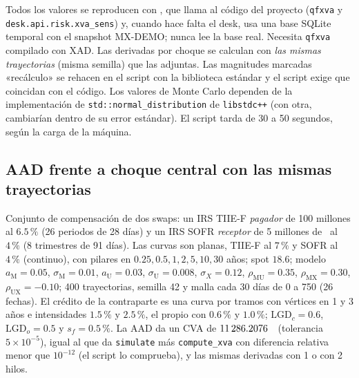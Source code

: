 \begin{sloppypar}
Todos los valores se reproducen con , que llama al código del
proyecto (\texttt{qfxva} y \texttt{desk.api.risk.xva\_sens}) y, cuando hace falta el desk, usa una base SQLite
temporal con el snapshot MX-DEMO; nunca lee la base real. Necesita \texttt{qfxva} compilado con XAD. Las derivadas
por choque se calculan con \emph{las mismas trayectorias} (misma semilla) que las adjuntas. Las magnitudes marcadas
«recálculo» se rehacen en el script con la biblioteca estándar y el script exige que coincidan con el código. Los
valores de Monte Carlo dependen de la implementación de \texttt{std::normal\_distribution} de \texttt{libstdc++}
(con otra, cambiarían dentro de su error estándar). El script tarda de 30 a 50 segundos, según la carga de la máquina.

\subsection{AAD frente a choque central con las mismas trayectorias}\label{sec:cap16-ej-choque}

Conjunto de compensación de dos swaps: un IRS TIIE-F \emph{pagador} de 100 millones al $6.5\,\%$ (26 periodos de 28
días) y un IRS SOFR \emph{receptor} de 5 millones de \USD\ al $4\,\%$ (8 trimestres de 91 días). Las curvas
son planas, TIIE-F al $7\,\%$ y SOFR al $4\,\%$ (continuo), con pilares en $0.25,0.5,1,2,5,10,30$ años; spot $18.6$;
modelo $a_{\mathrm M}=0.05$, $\sigma_{\mathrm M}=0.01$, $a_{\mathrm U}=0.03$, $\sigma_{\mathrm U}=0.008$,
$\sigma_X=0.12$, $\rho_{\mathrm{MU}}=0.35$, $\rho_{\mathrm{MX}}=0.30$, $\rho_{\mathrm{UX}}=-0.10$; 400 trayectorias, semilla 42 y
malla cada 30 días de 0 a 750 (26 fechas). El crédito de la contraparte es una curva por tramos con vértices en 1 y 3
años e intensidades $1.5\,\%$ y $2.5\,\%$, el propio con $0.6\,\%$ y $1.0\,\%$; $\mathrm{LGD}_c=0.6$,
$\mathrm{LGD}_o=0.5$ y $s_f=0.5\,\%$. La AAD da un CVA de
$\verif{cap16-aad-valor-cva}{11286.2076}$~\MXN\ (tolerancia $5\times10^{-5}$), igual al que da
\texttt{simulate} más \texttt{compute\_xva} con diferencia relativa menor que $10^{-12}$ (el script lo comprueba), y
las mismas derivadas con 1 o con 2 hilos.


\end{sloppypar}
